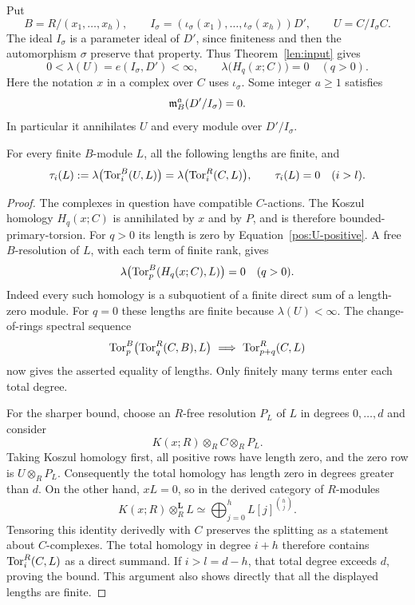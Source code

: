 Put
\[
 B=R/(x_1,\ldots,x_h),\qquad
 I_\sigma=(\iota_\sigma(x_1),\ldots,
                 \iota_\sigma(x_h))D',\qquad U=C/I_\sigma C.
\]
The ideal $I_\sigma$ is a parameter ideal of $D'$, since finiteness
and then the automorphism $\sigma$ preserve that property.  Thus
Theorem~\ref{len:input} gives
\begin{equation}\label{pos:U-positive}
 0<\lambda(U)=e(I_\sigma,D')<\infty,
 \qquad
 \lambda\bigl(H_q(x;C)\bigr)=0\quad(q>0).
\end{equation}
Here the notation $x$ in a complex over $C$ uses $\iota_\sigma$.
Some integer $a\ge1$ satisfies
\begin{equation}\label{pos:uniform-annihilator}
 \mathfrak{m}_B^a(D'/I_\sigma)=0.
\end{equation}
In particular it annihilates $U$ and every module over $D'/I_\sigma$.

\begin{lemma}\label{pos:tor-bound}
For every finite $B$-module $L$, all the following lengths are finite,
and
\begin{equation}\label{pos:tor-identification}
 \tau_i(L):=\lambda\bigl(\operatorname{Tor}_i^B(U,L)\bigr)
     =\lambda\bigl(\operatorname{Tor}_i^R(C,L)\bigr),
 \qquad \tau_i(L)=0\quad(i>l).
\end{equation}
\end{lemma}

\begin{proof}
The complexes in question have compatible $C$-actions.  The Koszul
homology $H_q(x;C)$ is annihilated by $x$ and by $P$, and is therefore
bounded-primary-torsion.  For $q>0$ its length is zero by
Equation~\eqref{pos:U-positive}.  A free $B$-resolution of $L$,
with each term of finite rank, gives
\[
 \lambda\bigl(\operatorname{Tor}_p^B(H_q(x;C),L)\bigr)=0\quad(q>0).
\]
Indeed every such homology is a subquotient of a finite direct sum
of a length-zero module.  For $q=0$ these lengths are finite because
$\lambda(U)<\infty$.  The change-of-rings spectral sequence
\[
 \operatorname{Tor}_p^B\bigl(\operatorname{Tor}_q^R(C,B),L\bigr)
       \ \Longrightarrow\ \operatorname{Tor}_{p+q}^R(C,L)
\]
now gives the asserted equality of lengths.  Only finitely many
terms enter each total degree.

For the sharper bound, choose an $R$-free resolution $P_L$ of $L$
in degrees $0,\ldots,d$ and consider
\[
 K(x;R)\otimes_R C\otimes_R P_L.
\]
Taking Koszul homology first, all positive rows have length zero,
and the zero row is $U\otimes_R P_L$.  Consequently the total
homology has length zero in degrees greater than $d$.  On the other
hand, $xL=0$, so in the derived category of $R$-modules
\[
 K(x;R)\otimes_R^{\mathbf L}L
       \simeq\bigoplus_{j=0}^h L[j]^{\binom hj}.
\]
Tensoring this identity derivedly with $C$ preserves the splitting
as a statement about $C$-complexes.  The total homology in degree
$i+h$ therefore contains $\operatorname{Tor}_i^R(C,L)$ as a direct summand.  If
$i>l=d-h$, that total degree exceeds $d$, proving the bound.  This
argument also shows directly that all the displayed lengths are
finite.
\end{proof}

